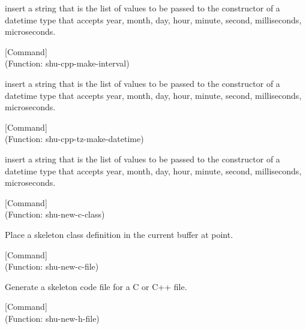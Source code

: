 \begin{doc-string}
insert a string that is the list of values to be passed to the constructor of
 a datetime type that accepts year, month, day, hour, minute, second,
 milliseconds, microseconds.
\end{doc-string}

\vspace{1em}
\noindent
{}
\usebox{\funcname}
 \hfill [Command]\\%
 (Function: shu-cpp-make-interval)

\begin{doc-string}
insert a string that is the list of values to be passed to the constructor of a datetime
 type that accepts year, month, day, hour, minute, second, milliseconds, microseconds.
\end{doc-string}

\vspace{1em}
\noindent
{}
\usebox{\funcname}
 \hfill [Command]\\%
 (Function: shu-cpp-tz-make-datetime)

\begin{doc-string}
insert a string that is the list of values to be passed to the constructor of
 a datetime type that accepts year, month, day, hour, minute, second,
 milliseconds, microseconds.
\end{doc-string}

\vspace{1em}
\noindent
{}
\usebox{\funcname}
 \hfill [Command]\\%
 (Function: shu-new-c-class)

\begin{doc-string}
Place a skeleton class definition in the current buffer at point.
\end{doc-string}

\vspace{1em}
\noindent
{}
\usebox{\funcname}
 \hfill [Command]\\%
 (Function: shu-new-c-file)

\begin{doc-string}
Generate a skeleton code file for a C or C++ file.
\end{doc-string}

\vspace{1em}
\noindent
{}
\usebox{\funcname}
 \hfill [Command]\\%
 (Function: shu-new-h-file)

